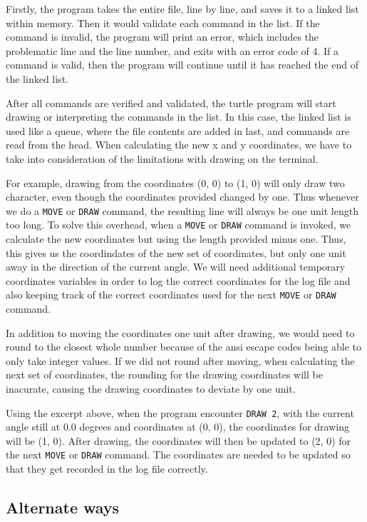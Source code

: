 \documentclass[a4paper, 12pt, titlepage]{article}
\newcommand{\code}[1]{\small\texttt{#1}\normalsize}
\begin{document}
Firstly, the program takes the entire file, line by line, and saves it to
a linked list within memory. Then it would validate each command in the list.
If the command is invalid, the program will print an error, which includes
the problematic line and the line number, and exits with an error code of 4.
If a command is valid, then the program will continue until it has reached
the end of the linked list.

After all commands are verified and validated, the turtle program will start
drawing or interpreting the commands in the list. In this case, the linked
list is used like a queue, where the file contents are added in last, and
commands are read from the head. When calculating the new x and y coordinates,
we have to take into consideration of the limitations with drawing on the
terminal.

For example, drawing from the coordinates (0, 0) to (1, 0) will only draw
two character, even though the coordinates provided changed by one.
Thus whenever we do a \code{MOVE} or \code{DRAW} command, the resulting
line will always be one unit length too long. To solve this overhead,
when a \code{MOVE} or \code{DRAW} command is invoked, we calculate the
new coordinates but using the length provided minus one. Thus, this gives
us the coordindates of the new set of coordinates, but only one unit away
in the direction of the current angle. We will need additional temporary
coordinates variables in order to log the correct coordinates for the log
file and also keeping track of the correct coordinates used for the next
\code{MOVE} or \code{DRAW} command.

In addition to moving the coordinates one unit after drawing, we would need to
round to the closest whole number because of the ansi escape codes being able
to only take integer values. If we did not round after moving, when
calculating the next set of coordinates, the rounding for the drawing
coordinates will be inacurate, causing the drawing coordinates to deviate by
one unit.

Using the excerpt above, when the program encounter \code{DRAW 2},
with the current angle still at 0.0 degrees and coordinates at (0, 0),
the coordinates for drawing will be (1, 0). After drawing, the coordinates
will then be updated to (2, 0) for the next \code{MOVE} or \code{DRAW}
command. The coordinates are needed to be updated so that they get recorded
in the log file correctly.

\subsection{Alternate ways}
\end{document}
